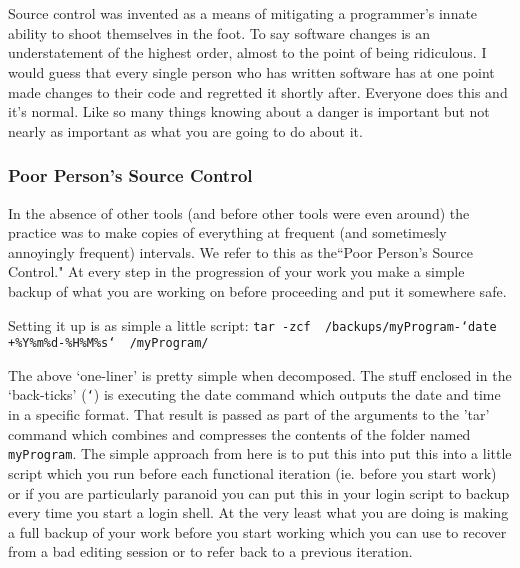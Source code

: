 \chapter[Source Control]{}

Source control was invented as a means of mitigating a programmer's innate ability to shoot themselves in the foot.
To say software changes is an understatement of the highest order, almost to the point of being ridiculous.  I would
guess that every single person who has written software has at one point made changes to their code and regretted it 
shortly after.  Everyone does this and it's normal.  Like so many things knowing about a danger is important but not 
nearly as important as what you are going to do about it.

\subsection{Poor Person's Source Control}{}

In the absence of other tools (and before other tools were even around) the practice was to make copies of everything
at frequent (and sometimesly annoyingly frequent) intervals.  We refer to this as the``Poor Person's Source Control."
At every step in the progression of your work you make a simple backup of what you are working on before proceeding and
put it somewhere safe.

Setting it up is as simple a little script:
	{\tt tar -zcf ~/backups/myProgram-`date +\%Y\%m\%d-\%H\%M\%s` ~/myProgram/}

The above `one-liner' is pretty simple when decomposed.  The stuff enclosed in the `back-ticks' ({\tt `}) is executing the date command which outputs the date and time in a specific format.  That result is passed as part of the arguments to the 'tar' command which combines and compresses the contents of the folder named {\tt myProgram}.  The simple approach from here is to put this
into put this into a little script which you run before each functional iteration (ie. before you start work) or if you are particularly paranoid you can put this in your login script to backup every time you start a login shell.  At the very least
what you are doing is making a full backup of your work before you start working which you can use to recover from a bad editing
session or to refer back to a previous iteration.

